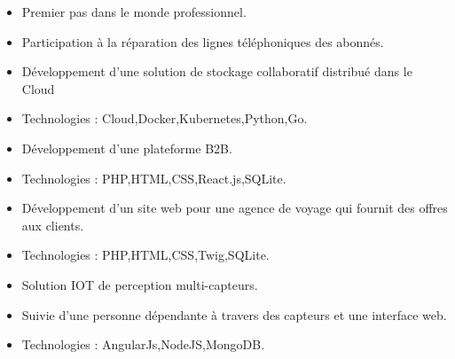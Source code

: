 
\begin{itemize}
\item Premier pas dans le monde professionnel.
\item Participation à la réparation des lignes téléphoniques des abonnés.
\end{itemize}


\begin{itemize}
\item Développement d'une solution de stockage collaboratif distribué dans le Cloud
\item Technologies : Cloud,Docker,Kubernetes,Python,Go.
\end{itemize}

\divider

\begin{itemize}
\item Développement d'une plateforme B2B.
\item Technologies : PHP,HTML,CSS,React.js,SQLite.
\end{itemize}

\divider

\begin{itemize}
\item Développement d'un site web pour une agence de voyage qui fournit des offres aux clients.
\item Technologies : PHP,HTML,CSS,Twig,SQLite.
\end{itemize}

\divider

\begin{itemize}
\item Solution IOT de perception multi-capteurs.
\item Suivie d'une personne dépendante à travers des capteurs et une interface web.    
\item Technologies : AngularJs,NodeJS,MongoDB.
\end{itemize}

